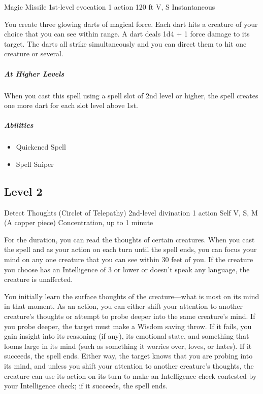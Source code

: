 \documentclass[a4paper,openany,twocolumn]{book}
\begin{document}
\DndSpellHeader
  {Magic Missile}
  {1st-level evocation}
  {1 action}
  {120 ft}
  {V, S}
  {Instantaneous}

You create three glowing darts of magical force. Each dart hits a creature of your choice that you can see within range. A dart deals 1d4 + 1 force damage to its target. The darts all strike simultaneously and you can direct them to hit one creature or several.

\subparagraph{At Higher Levels} When you cast this spell using a spell slot of 2nd level or higher, the spell creates one more dart for each slot level above 1st.

\subparagraph*{Abilities}
\begin{itemize} 
  \item Quickened Spell
  \item Spell Sniper
\end{itemize}

\subsection*{Level 2}

\DndSpellHeader
  {Detect Thoughts (Circlet of Telepathy)}
  {2nd-level divination}
  {1 action}
  {Self}
  {V, S, M (A copper piece)}
  {Concentration, up to 1 minute}
  
For the duration, you can read the thoughts of certain creatures. When you cast the spell and as your action on each turn until the spell ends, you can focus your mind on any one creature that you can see within 30 feet of you. If the creature you choose has an Intelligence of 3 or lower or doesn’t speak any language, the creature is unaffected.

You initially learn the surface thoughts of the creature—what is most on its mind in that moment. As an action, you can either shift your attention to another creature’s thoughts or attempt to probe deeper into the same creature’s mind. If you probe deeper, the target must make a Wisdom saving throw. If it fails, you gain insight into its reasoning (if any), its emotional state, and something that looms large in its mind (such as something it worries over, loves, or hates). If it succeeds, the spell ends. Either way, the target knows that you are probing into its mind, and unless you shift your attention to another creature’s thoughts, the creature can use its action on its turn to make an Intelligence check contested by your Intelligence check; if it succeeds, the spell ends.
\end{document}

